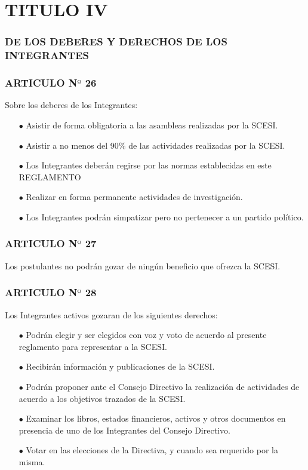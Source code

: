 \documentclass[letterpaper,11pt]{book}
\begin{document}
\section*{TITULO IV}
\subsubsection*{DE LOS DEBERES Y DERECHOS DE LOS INTEGRANTES}
\subsubsection*{ARTICULO N$º$ 26}
Sobre los deberes de los Integrantes:
\begin{itemize}
\item[$\bullet$] Asistir de forma obligatoria a las asambleas realizadas por la SCESI. 
\item[$\bullet$] Asistir a no menos del 90\% de las actividades realizadas por la SCESI. 
\item[$\bullet$] Los Integrantes deberán regirse por las normas establecidas en este REGLAMENTO 
\item[$\bullet$] Realizar en forma permanente actividades de investigación. 
\item[$\bullet$] Los Integrantes podrán simpatizar pero no pertenecer a un partido político.
\end{itemize}

\subsubsection*{ARTICULO N$º$ 27}
Los postulantes no podrán gozar de ningún beneficio que ofrezca la SCESI.
\subsubsection*{ARTICULO N$º$ 28}
Los Integrantes activos gozaran de los siguientes derechos: 
\begin{itemize}
\item[$\bullet$] Podrán elegir y ser elegidos con voz y voto de acuerdo al presente reglamento para representar a la SCESI. 
\item[$\bullet$] Recibirán información y publicaciones de la SCESI. 
\item[$\bullet$] Podrán proponer ante el Consejo Directivo la realización de actividades de acuerdo a los objetivos trazados de la SCESI. 
\item[$\bullet$] Examinar los libros, estados financieros, activos  y otros documentos en presencia de uno de los Integrantes del Consejo Directivo. 
\item[$\bullet$] Votar en las elecciones de la Directiva, y cuando sea requerido por la misma. 
\end{itemize}
\end{document}
